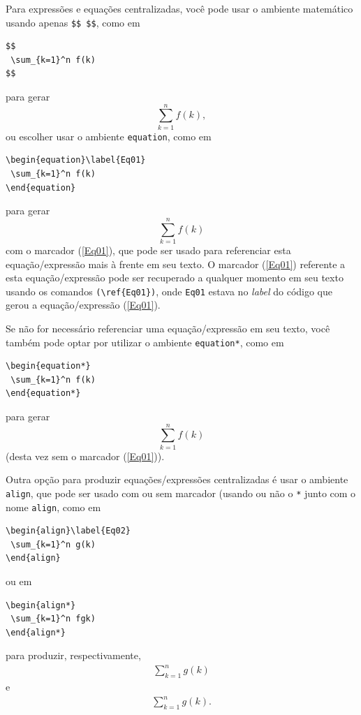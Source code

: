 \documentclass[a4paper,12pt]{report}%
\begin{document}
Para expressões e equações centralizadas, você pode usar o ambiente matemático usando apenas \verb|$$ $$|, como em
\begin{verbatim} 
$$
 \sum_{k=1}^n f(k) 
$$
\end{verbatim}
para gerar 
$$
\displaystyle \sum_{k=1}^n f(k), 
$$
ou escolher usar o ambiente \verb|equation|, como em
\begin{verbatim} 
\begin{equation}\label{Eq01}
 \sum_{k=1}^n f(k) 
\end{equation}
\end{verbatim}
para gerar
\begin{equation}\label{Eq01}
 \sum_{k=1}^n f(k) 
\end{equation}
com o marcador (\ref{Eq01}), que pode ser usado para referenciar esta equação/expressão mais à frente em seu texto. O marcador (\ref{Eq01}) referente a esta equação/expressão pode ser recuperado a qualquer momento em seu texto usando os comandos \verb|(\ref{Eq01})|, onde \verb|Eq01| estava no {\it label} do código que gerou a equação/expressão (\ref{Eq01}).

Se não for necessário referenciar uma equação/expressão em seu texto, você também pode optar por utilizar o ambiente \verb|equation*|, como em
\begin{verbatim} 
\begin{equation*}
 \sum_{k=1}^n f(k) 
\end{equation*}
\end{verbatim}
para gerar
\begin{equation*}
 \sum_{k=1}^n f(k) 
\end{equation*}
(desta vez sem o marcador (\ref{Eq01})). 

Outra opção para produzir equações/expressões centralizadas é usar o ambiente \verb|align|, que pode ser usado com ou sem marcador (usando ou não o \verb|*| junto com o nome \verb|align|, como em 
\begin{verbatim} 
\begin{align}\label{Eq02}
 \sum_{k=1}^n g(k) 
\end{align}
\end{verbatim}
ou em 
\begin{verbatim} 
\begin{align*}
 \sum_{k=1}^n fgk) 
\end{align*}
\end{verbatim}
para produzir, respectivamente, 
\begin{align}\label{Eq02}
 \sum_{k=1}^n g(k) 
\end{align}
e 
\begin{align*}
 \sum_{k=1}^n g(k). 
\end{align*}
\end{document}
